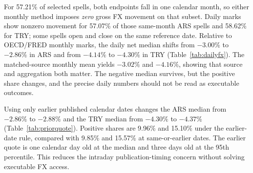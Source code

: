 \documentclass[sn-vancouver,Numbered]{sn-jnl}
\begin{document}
\begin{table}[t]
\caption{Frequency and source check for the same 7,105 selected spells per currency at the 20\% effective annual rate. Gross and net medians and positive net shares are percent. The same-source monthly mean averages the archived daily references in each calendar month; it differs in source and definition from OECD/FRED. Daily values use the most recent published date on or before each UTC endpoint. These are reference valuations, not executed swaps.}
\label{tab:dailyfx}\centering\small

\end{table}
For 57.21\% of selected spells, both endpoints fall in one calendar month, so either monthly method imposes \emph{zero} gross FX movement on that subset. Daily marks show nonzero movement for 57.07\% of those same-month ARS spells and 58.62\% for TRY; some spells open and close on the same reference date. Relative to OECD/FRED monthly marks, the daily net median shifts from $-3.00\%$ to $-2.86\%$ in ARS and from $-4.14\%$ to $-4.30\%$ in TRY (Table~\ref{tab:dailyfx}). The matched-source monthly mean yields $-3.02\%$ and $-4.16\%$, showing that source and aggregation both matter. The negative median survives, but the positive share changes, and the precise daily numbers should not be read as executable outcomes.

\begin{table}[htbp]
\caption{Timing sensitivity for the same selected clean spells at daily official references. The second rule uses the last published \emph{earlier calendar date} at each endpoint, avoiding use of a same-day quote that may have appeared after an on-chain event. Median and positive-share results are percentages. Neither rule verifies an accessible transaction price.}
\label{tab:priorquote}\centering\small

\end{table}
Using only earlier published calendar dates changes the ARS median from $-2.86\%$ to $-2.88\%$ and the TRY median from $-4.30\%$ to $-4.37\%$ (Table~\ref{tab:priorquote}). Positive shares are 9.96\% and 15.10\% under the earlier-date rule, compared with 9.85\% and 15.57\% at same-or-earlier dates. The earlier quote is one calendar day old at the median and three days old at the 95th percentile. This reduces the intraday publication-timing concern without solving executable FX access.
\end{document}
